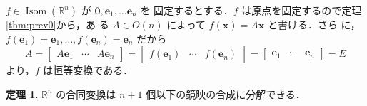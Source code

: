 \documentclass[11pt, uplatex, dvipdfmx, titlepage]{jsarticle}
\makeatletter
\DeclareMathOperator{\Isom}{Isom}
\renewenvironment{proof}[1][\proofname]{\par
  \pushQED{\qed}%
  \normalfont \topsep6\p@\@plus6\p@\relax
  \trivlist
  \item[\hskip\labelsep
         \bfseries
    {#1}]\ignorespaces
}{%
  \popQED\endtrivlist\@endpefalse
}
\theoremstyle{definition}
\newtheorem{theorem}{定理}[section]
\renewcommand{\proofname}{\textbf{証明}}
\makeatother
\begin{document}
\begin{proof}
  $f \in \Isom(\mathbb{R}^n)$ が $\bm{0}, \bm{e}_1, \ldots \bm{e}_n$ を
  固定するとする．$f$ は原点を固定するので定理\ref{thm:prev0}から，あ
  る $A \in O(n)$ によって $f(\bm{x}) = A\bm{x}$ と書ける．さら
  に，$f(\bm{e}_1) = \bm{e}_1, \ldots, f(\bm{e}_n) = \bm{e}_n$ だから
  \[
    A=\left[
     \begin{array}{ccc}
       A\bm{e}_1 & \cdots & A\bm{e}_n
     \end{array}
   \right]=\left[
     \begin{array}{ccc}
       f(\bm{e}_1) & \cdots & f(\bm{e}_n)
     \end{array}
   \right]=\left[
      \begin{array}{ccc}
        \bm{e}_1 & \cdots & \bm{e}_n
      \end{array}
    \right] =E
  \]
  より，$f$ は恒等変換である．
\end{proof}

\begin{theorem}
  $\mathbb{R}^n$ の合同変換は $n+1$ 個以下の鏡映の合成に分解できる．
\end{theorem}
\end{document}

